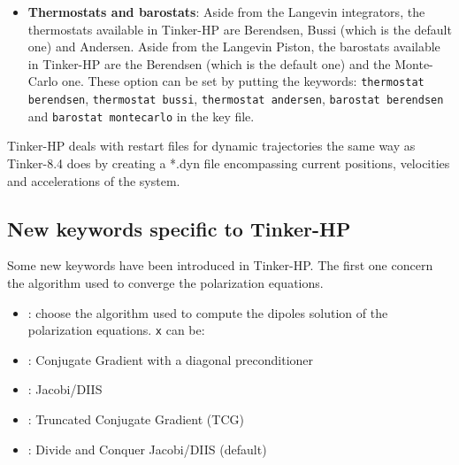 \documentclass[peerreview]{IEEEtran}
\def\bbk{\textbf{\textsc{Bbk}}}
\def\baoab{\textbf{\textsc{Baoab}}}
\def\respa{\textbf{\textsc{Respa}}}
\def\baoabrespa{\textbf{\textsc{BaoabRespa}}}
\def\respaone{\textbf{\textsc{Respa1}}}
\def\baoabrespaone{\textbf{\textsc{BaoabRespa1}}}
\def\baoabpiston{\textbf{\textsc{BaoabPiston}}}
\newlength{\mylen}
\begin{document}
\begin{itemize}
\vskip2.5mm
For all the Langevin integrators (\bbk, \baoab, \baoabrespa, \baoabrespaone\ and \baoabpiston), the friction (in  {\em ps}$^{-1}$) can be controlled by the keyword \texttt{friction x}, the default being 1  {\em ps}$^{-1}$.

For \respa, \baoabrespa, \respaone\ and \baoabrespaone, the inner timestep can be imposed by the keyword \texttt{dshort x}, \texttt{x} being its desired value in  {\em ps}.

For \respaone\ and \baoabrespaone, the intermediate timestep can be imposed by the keyword \texttt{dinter x}, \texttt{x} being its desired value in  {\em ps}.

For \baoabpiston,  the mass of the piston (in atomic units) can be set by the keyword \texttt{masspiston x} and 
the friction of the piston (in  {\em ps}$^{-1}$) can be set by the keyword \texttt{frictionpiston x}.

\vskip5mm
\item \textbf{Thermostats and barostats}: Aside from the Langevin integrators, the thermostats available in Tinker-HP are Berendsen, Bussi (which is the default one) and Andersen. Aside from the Langevin Piston, the barostats available in Tinker-HP are the Berendsen (which is the default one) and the Monte-Carlo one. These option can be set by putting the keywords: \texttt{thermostat berendsen}, \texttt{thermostat bussi}, \texttt{thermostat andersen}, \texttt{barostat berendsen} and \texttt{barostat montecarlo} in the key file.
\end{itemize}

Tinker-HP deals with restart files for dynamic trajectories the same way as Tinker-8.4 does by creating a *.dyn file encompassing current positions, velocities and accelerations of the system.

\subsection{New keywords specific to Tinker-HP}
Some new keywords have been introduced in Tinker-HP. The first one concern the algorithm used to converge the polarization equations. 

\begin{itemize}
\item[] : choose  the algorithm used to compute the dipoles solution of the polarization equations. \texttt{x} can be:

    \item[] : Conjugate Gradient with a diagonal preconditioner
    \item[] : Jacobi/DIIS
    \item[] : Truncated Conjugate Gradient (TCG)
    \item[] : Divide and Conquer Jacobi/DIIS (default)

\end{itemize}
\end{document}
